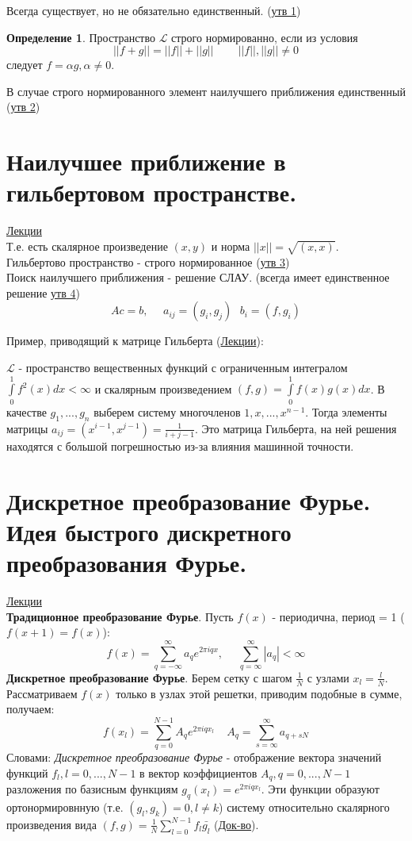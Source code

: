 \documentclass[specialist, subf, href, colorlinks=true, 12pt, times, mtpro, final]{disser}
\theoremstyle{definition}
\newtheorem{defn}{Определение}[section]
\begin{document}
	Всегда существует, но не обязательно единственный. (\hyperlink {lects.28}{утв 1})
	
	\begin{defn}  
		Пространство $\mathcal{L}$ строго нормированно, если из условия
		$$
			||f+g|| = ||f||+||g|| \ \ \ \ \ \ \ \ \ \ ||f||,||g|| \ne 0
		$$
		следует $f = \alpha g, \alpha \ne 0$.
	\end{defn}

	В случае строго нормированного элемент наилучшего приближения единственный (\hyperlink {lects.29}{утв 2})

\section {Наилучшее приближение в гильбертовом пространстве.}
	\hyperlink {lects.29}{Лекции}\\
	Т.е. есть скалярное произведение $(x,y)$ и норма $||x||=\sqrt{(x,x)}$. \\
	Гильбертово пространство - строго нормированное (\hyperlink {lects.29}{утв 3}) \\
	
	Поиск наилучшего приближения - решение СЛАУ. (всегда имеет единственное решение \hyperlink {lects.30}{утв 4})
	$$
		Ac = b, \ \ \ \ \ \ a_{ij} = (g_i, g_j) \ \ \ b_i = (f, g_i)
	$$
	
	Пример, приводящий к матрице Гильберта (\hyperlink {lects.31}{Лекции}):
	
	$\mathcal{L}$ - пространство вещественных функций с ограниченным интегралом $\int\limits_0^1 f^2(x)dx < \infty $ и скалярным произведением $(f,g) = \int\limits_0^1 f(x)g(x)dx$. В качестве $g_1, ..., g_n$ выберем систему многочленов $1, x, ..., x^{n-1}$. Тогда элементы матрицы $a_{ij} = (x^{i-1},x^{j-1}) = \frac{1}{i+j-1}$. Это матрица Гильберта, на ней решения находятся с большой погрешностью из-за влияния машинной точности. 

\section {Дискретное преобразование Фурье. Идея быстрого дискретного преобразования Фурье.}
	\hyperlink {lects.32}{Лекции}\\
	\textbf{Традиционное преобразование Фурье}. Пусть $f(x)$ - периодична, период = 1 ($f(x+1) = f(x)$):
	$$
		f(x) = \sum\limits_{q = -\infty}^{\infty} a_q e^{2\pi i qx},  \ \ \  \ \ \ \sum\limits_{q = \infty}^{\infty}|a_q| < \infty
	$$
	\textbf{Дискретное преобразование Фурье}. Берем сетку с шагом $\frac{1}{N}$ с узлами $x_l = \frac{l}{N}$. Рассматриваем $f(x)$ только в узлах этой решетки, приводим подобные в сумме, получаем:
	$$
		f(x_l) = \sum\limits_{q = 0}^{N-1} A_q e^{2\pi i qx_l} \ \ \ \ \ A_q = \sum\limits_{s = \infty}^{\infty} a_{q+sN}
	$$
	Словами: \textit{Дискретное преобразование Фурье} - отображение вектора значений функций $f_l, l = 0, ..., N-1$ в вектор коэффициентов $A_q, q = 0, ..., N-1$ разложения по базисным функциям $g_q(x_l) = e^{2\pi i qx_l}$. Эти функции образуют ортонормировнную (т.е. $(g_l,g_k) = 0, l \ne k$) систему относительно скалярного произведения вида $(f,g) = \frac{1}{N}\sum\limits_{l = 0}^{N-1}f_l \bar{g_l}$ (\hyperlink {lects.32}{Док-во}). 
	
\end{document}
